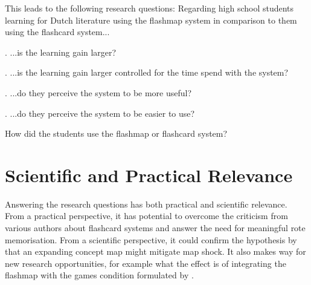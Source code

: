 This leads to the following research questions: Regarding high school students learning for Dutch literature using the flashmap system in comparison to them using the flashcard system...

\label{benefit}
\label{effectiveness}
. ...is the learning gain larger?

\label{efficiency}
. ...is the learning gain larger controlled for the time spend with the system?

\label{perception}
\label{usefulness}
. ...do they perceive the system to be more useful?

\label{ease}
. ...do they perceive the system to be easier to use?

\label{howused}
 How did the students use the flashmap or flashcard system?

\section{Scientific and Practical Relevance}

Answering the research questions has both practical and scientific relevance. From a practical perspective, it has potential to overcome the criticism from various authors about flashcard systems and answer the need for meaningful rote memorisation. From a scientific perspective, it could confirm the hypothesis by  that an expanding concept map might mitigate map shock. It also makes way for new research opportunities, for example what the effect is of integrating the flashmap with the games condition formulated by . 

